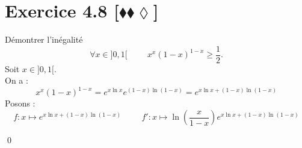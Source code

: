 \documentclass[10pt]{article}
\begin{document}
\section*{Exercice 4.8 [$\blacklozenge\blacklozenge\lozenge$]}
\begin{tcolorbox}[enhanced, width=7in, center, size=fbox, fontupper=\large, drop shadow southwest]
    Démontrer l'inégalité
    \begin{equation*}
        \forall{x\in]0,1[}\hspace{1cm}x^x(1-x)^{1-x}\geq\frac{1}{2}.
    \end{equation*}
    Soit $x\in]0,1[$.\\
    On a :
    \begin{equation*}
        x^x(1-x)^{1-x}=e^{x\ln x}e^{(1-x)\ln(1-x)}=e^{x\ln{x}+(1-x)\ln(1-x)}
    \end{equation*}
    Posons :
    \begin{equation*}
        f:x\mapsto e^{x\ln{x}+(1-x)\ln(1-x)} \hspace{1cm} f':x\mapsto \ln\left(\frac{x}{1-x}\right)e^{x\ln{x}+(1-x)\ln(1-x)}
    \end{equation*}
    \begin{center}
    \end{center}
    \qed
\end{tcolorbox}
\end{document}
